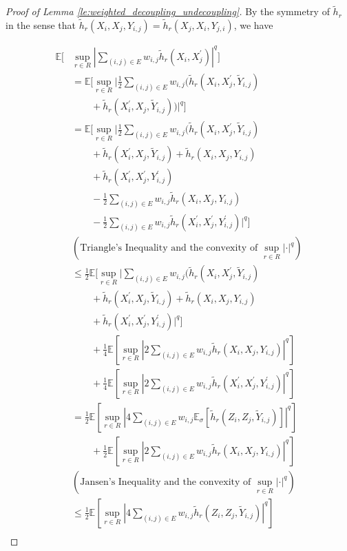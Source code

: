 \documentclass[letterpaper]{article} %
\def\DoubleColumn{}
\newcommand{\E}{\mathbb{E}}
\newcommand{\pair}[1]{(#1)}
\begin{document}
\begin{proof}[Proof of Lemma \ref{le:weighted_decoupling_undecoupling}]
    By the symmetry of $\tilde{h}_r$ in the sense that $\tilde{h}_r(X_i,X_j,Y_{i,j})=\tilde{h}_r(X_j,X_i,Y_{j,i})$, we have
    \DoubleColumn
    \begin{align*}
        \E[&\sup_{r\in R} |\sum_{\pair{i,j}\in E}w_{i,j}\tilde{h}_r(X_i,X_j^\prime)|^q]\\
        &=\E[\sup_{r\in R} |\frac{1}{2}\sum_{\pair{i,j}\in E}w_{i,j}(\tilde{h}_r(X_i,X_j^\prime,\tilde{Y}_{i,j})\\
        &\qquad+\tilde{h}_r(X_i^\prime,X_j,\tilde{Y}_{i,j}))|^q]\\
        &= \E[\sup_{r\in R} |\frac{1}{2}\sum_{\pair{i,j}\in E}w_{i,j}(\tilde{h}_r(X_i,X_j^\prime,\tilde{Y}_{i,j})\\
        &\qquad+\tilde{h}_r(X_i^\prime,X_j,\tilde{Y}_{i,j})+\tilde{h}_r(X_i,X_j,Y_{i,j})\\
        &\qquad+\tilde{h}_r(X_i^\prime,X_j^\prime,Y^\prime_{i,j})\\
        &\qquad-\frac{1}{2}\sum_{\pair{i,j}\in E}w_{i,j}\tilde{h}_r(X_i,X_j,Y_{i,j})\\
        &\qquad-\frac{1}{2}\sum_{\pair{i,j}\in E}w_{i,j}\tilde{h}_r(X_i^\prime,X_j^\prime,Y^\prime_{i,j})|^q]\\
        &(\text{Triangle's Inequality and the convexity of }\sup_{r\in R}|\cdot|^q)\\
        &\le \frac{1}{2}\E[\sup_{r\in R} |\sum_{\pair{i,j}\in E}w_{i,j}(\tilde{h}_r(X_i,X_j^\prime,\tilde{Y}_{i,j})\\
        &\qquad+\tilde{h}_r(X_i^\prime,X_j,\tilde{Y}_{i,j})+\tilde{h}_r(X_i,X_j,Y_{i,j})\\
        &\qquad+\tilde{h}_r(X_i^\prime,X_j^\prime,Y^\prime_{i,j})|^q]\\
        &\qquad+ \frac{1}{4}\E[\sup_{r\in R} |2\sum_{\pair{i,j}\in E}w_{i,j}\tilde{h}_r(X_i,X_j,Y_{i,j})|^q] \\
        &\qquad+ \frac{1}{4}\E[\sup_{r\in R} |2\sum_{\pair{i,j}\in E}w_{i,j}\tilde{h}_r(X_i^\prime,X_j^\prime,Y^\prime_{i,j})|^q]\\
        &= \frac{1}{2}\E[\sup_{r\in R} |4\sum_{\pair{i,j}\in E}w_{i,j}\E_\sigma[\tilde{h}_r(Z_i,Z_j,\tilde{Y}_{i,j})]|^q]\\
        &\qquad+ \frac{1}{2}\E[\sup_{r\in R} |2\sum_{\pair{i,j}\in E}w_{i,j}\tilde{h}_r(X_i,X_j,Y_{i,j})|^q]\\
        &(\text{Jansen's Inequality and the convexity of }\sup_{r\in R}|\cdot|^q)\\
        &\le \frac{1}{2}\E[\sup_{r\in R} |4\sum_{\pair{i,j}\in E}w_{i,j}\tilde{h}_r(Z_i,Z_j,\tilde{Y}_{i,j})|^q] \\

\end{align*}
\end{proof}
\end{document}
